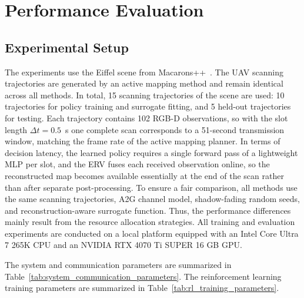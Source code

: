 \documentclass[journal]{IEEEtran}
\begin{document}
\section{Performance Evaluation}
\label{sec:performance_evaluation}
\subsection{Experimental Setup}
The experiments use the Eiffel scene from Macarons++~\cite{C5,C7}. The UAV scanning trajectories are generated by an active mapping method and remain identical across all methods. In total, 15 scanning trajectories of the scene are used: 10 trajectories for policy training and surrogate fitting, and 5 held-out trajectories for testing. Each trajectory contains 102 RGB-D observations, so with the slot length $\Delta t=0.5$~s one complete scan corresponds to a 51-second transmission window, matching the frame rate of the active mapping planner. In terms of decision latency, the learned policy requires a single forward pass of a lightweight MLP per slot, and the ERV fuses each received observation online, so the reconstructed map becomes available essentially at the end of the scan rather than after separate post-processing. To ensure a fair comparison, all methods use the same scanning trajectories, A2G channel model, shadow-fading random seeds, and reconstruction-aware surrogate function. Thus, the performance differences mainly result from the resource allocation strategies. All training and evaluation experiments are conducted on a local platform equipped with an Intel Core Ultra 7 265K CPU and an NVIDIA RTX 4070 Ti SUPER 16 GB GPU.

The system and communication parameters are summarized in Table~\ref{tab:system_communication_parameters}. The reinforcement learning training parameters are summarized in Table~\ref{tab:rl_training_parameters}.
\end{document}
